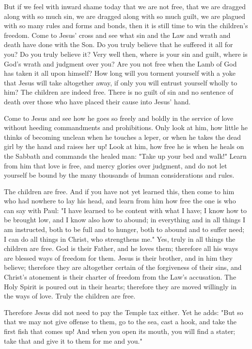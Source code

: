But if we feel with inward shame today that we are not free, that we are dragged along with so much sin, we are dragged along with so much guilt, we are plagued with so many rules and forms and bonds, then it is still time to win the children’s freedom. Come to Jesus’ cross and see what sin and the Law and wrath and death have done with the Son. Do you truly believe that he suffered it all for you? Do you truly believe it? Very well then, where is your sin and guilt, where is God’s wrath and judgment over you? Are you not free when the Lamb of God has taken it all upon himself? How long will you torment yourself with a yoke that Jesus will take altogether away, if only you will entrust yourself wholly to him? The children are indeed free. There is no guilt of sin and no sentence of death over those who have placed their cause into Jesus’ hand.

Come to Jesus and see how he goes so freely and boldly in the service of love without heeding commandments and prohibitions. Only look at him, how little he thinks of becoming unclean when he touches a leper, or when he takes the dead girl by the hand and raises her up! Look at him, how free he is when he heals on the Sabbath and commands the healed man: "Take up your bed and walk!" Learn from him that love is free, and mercy glories over judgment, and do not let yourself be bound by the many thousands of human considerations and rules.

The children are free. And if you have not yet learned this, then come to him who had nowhere to lay his head, and learn from him how free the one is who can say with Paul: "I have learned to be content with what I have; I know how to be brought low, and I know also how to abound; in everything and in all things I am instructed, both to be full and to hunger, both to abound and to suffer need; I can do all things in Christ, who strengthens me." Yes, truly in all things the children are free. God is their Father, and he loves them; therefore all his ways are blessed ways of freedom for them. Jesus is their brother, and in him they believe; therefore they are altogether certain of the forgiveness of their sins, and Christ’s atonement is their charter of freedom from the Law’s accusation. The Holy Spirit is poured out in their hearts; therefore they are moved willingly in the ways of love. Truly the children are free.

Therefore Jesus did not need to pay the Temple tax either. Yet he adds: "But so that we may not give offense to them, go to the sea, cast a hook, and take the first fish that comes up! And when you open its mouth, you will find a stater; take that and give it to them for me and you."

